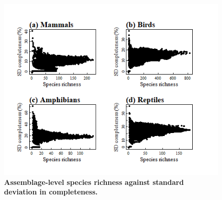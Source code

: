 \begin{figure}[h!]
\centering
\includegraphics[scale=0.8]{Supporting/Chapter2/Figures/Maps/sd_SR.png}
\caption[]{\textbf{Assemblage-level species richness against standard deviation in completeness.}}
\label{}
\end{figure}

\clearpage
\newpage
\pagebreak

\clearpage
\newpage
\pagebreak

